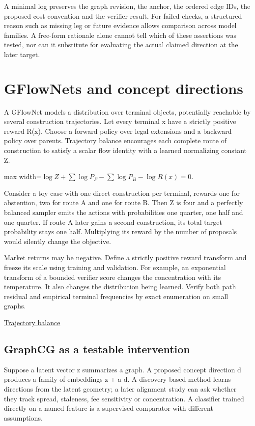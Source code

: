 \documentclass[11pt,oneside,openany]{book}
\begin{document}
A minimal log preserves the graph revision, the anchor, the ordered edge IDs, the proposed cost convention and the verifier result. For failed checks, a structured reason such as missing leg or future evidence allows comparison across model families. A free-form rationale alone cannot tell which of these assertions was tested, nor can it substitute for evaluating the actual claimed direction at the later target.

\chapter{GFlowNets and concept directions}
A GFlowNet models a distribution over terminal objects, potentially reachable by several construction trajectories. Let every terminal x have a strictly positive reward R(x). Choose a forward policy over legal extensions and a backward policy over parents. Trajectory balance encourages each complete route of construction to satisfy a scalar flow identity with a learned normalizing constant Z.

\begin{center}\begin{adjustbox}{max width=\linewidth}$\displaystyle \log Z+\sum\log P_F-\sum\log P_B-\log R(x)=0.$\end{adjustbox}\end{center}
Consider a toy case with one direct construction per terminal, rewards one for abstention, two for route A and one for route B. Then Z is four and a perfectly balanced sampler emits the actions with probabilities one quarter, one half and one quarter. If route A later gains a second construction, its total target probability stays one half. Multiplying its reward by the number of proposals would silently change the objective.

Market returns may be negative. Define a strictly positive reward transform and freeze its scale using training and validation. For example, an exponential transform of a bounded verifier score changes the concentration with its temperature. It also changes the distribution being learned. Verify both path residual and empirical terminal frequencies by exact enumeration on small graphs.

{\small\sffamily\href{https://arxiv.org/abs/2201.13259}{Trajectory balance}\par}
\section*{GraphCG as a testable intervention}
Suppose a latent vector z summarizes a graph. A proposed concept direction d produces a family of embeddings z + a d. A discovery-based method learns directions from the latent geometry; a later alignment study can ask whether they track spread, staleness, fee sensitivity or concentration. A classifier trained directly on a named feature is a supervised comparator with different assumptions.
\end{document}
